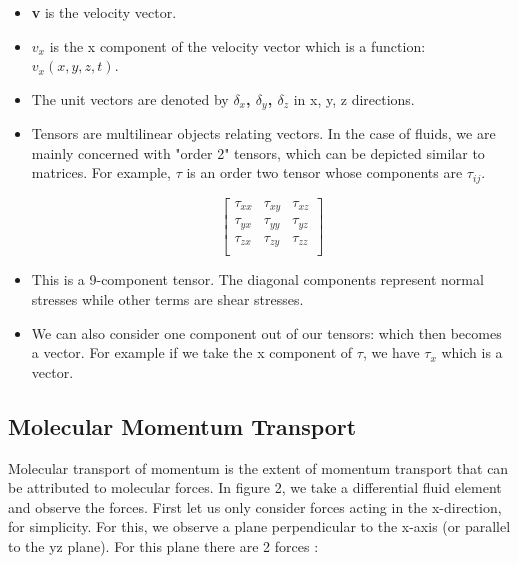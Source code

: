 \begin{itemize}

    \item \textbf{v} is the velocity vector.

    \item $v_{x}$ is the x component of the velocity vector which is a function: $v_{x} (x, y, z, t)$.

    \item The unit vectors are denoted by \textbf{$\delta_{x}$, $\delta_{y}$, $\delta_{z}$} in x, y, z directions.

    \item Tensors are multilinear objects relating vectors. In the case of fluids, we are mainly concerned with "order 2" tensors, which can be depicted similar to matrices. For example, $\tau$ is an order two tensor whose components are $\tau_{ij}$.

$$\begin{bmatrix}  

    \tau_{xx} & \tau_{xy} & \tau_{xz} \\
    \tau_{yx} & \tau_{yy} & \tau_{yz} \\
    \tau_{zx} & \tau_{zy} & \tau_{zz} \\
    
\end{bmatrix}$$

    \item This is a 9-component tensor. The diagonal components represent normal stresses while other terms are shear stresses.

    \item We can also consider one component out of our tensors: which then becomes a vector. For example if we take the x component of $\tau$, we have $\tau_{x}$ which is a vector.

\end{itemize}


\subsection{Molecular Momentum Transport}

Molecular transport of momentum is the extent of momentum transport that can be attributed to molecular forces. In figure 2, we take a differential fluid element and observe the forces. First let us only consider forces acting in the x-direction, for simplicity. For this, we observe a plane perpendicular to the x-axis (or parallel to the yz plane). For this plane there are 2 forces :

